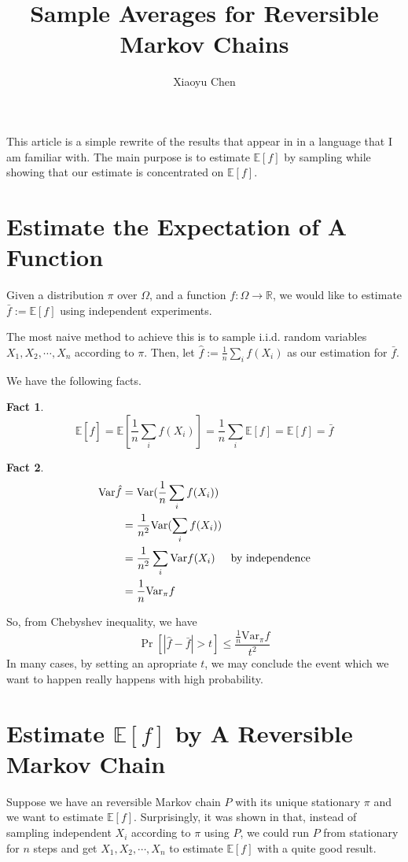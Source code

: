 \documentclass{article}
\title{Sample Averages for Reversible Markov Chains}
\author{Xiaoyu Chen}
\date{}
\newtheorem{fact}{Fact}[section]
\begin{document}
\maketitle
This article is a simple rewrite of the results that appear in \cite{aldous1987markov} in a language that I am familiar with.
The main purpose is to estimate $\mathbb{E}[f]$ by sampling while showing that our estimate is concentrated on $\mathbb{E}[f]$.

\section{Estimate the Expectation of A Function}
Given a distribution $\pi$ over $\Omega$, and a function $f: \Omega \to \mathbb{R}$, we would like to estimate $\bar{f} := \mathbb{E}[f]$ using independent experiments.

The most naive method to achieve this is to sample i.i.d. random variables $X_1, X_2, \cdots, X_n$ according to $\pi$.
Then, let $\hat{f} := \frac{1}{n}\sum_i f(X_i)$ as our estimation for $\bar{f}$.

We have the following facts.

\begin{fact}
  \[\mathbb{E}[\hat{f}] = \mathbb{E}[\frac{1}{n}\sum_i f(X_i)] = \frac{1}{n}\sum_i \mathbb{E}[f] = \mathbb{E}[f] = \bar{f}\]
\end{fact}

\begin{fact}
  \begin{align*}
    \mathrm{Var} \hat{f}
    &= \mathrm{Var} (\frac{1}{n} \sum_i f(X_i)) \\
    &= \frac{1}{n^2} \mathrm{Var} (\sum_i f(X_i)) \\
    &= \frac{1}{n^2} \sum_i \mathrm{Var} f(X_i) \hspace{0.5cm} \mbox{by independence}\\
    &= \frac{1}{n} \mathrm{Var}_\pi f
  \end{align*}
\end{fact}

So, from Chebyshev inequality, we have
\[\Pr[|\hat{f} - \bar{f}| > t] \leq \frac{\frac{1}{n} \mathrm{Var}_\pi f}{t^2}\]
In many cases, by setting an apropriate $t$, we may conclude the event which we want to happen really happens with high probability.

\section{Estimate $\mathbb{E}[f]$ by A Reversible Markov Chain}
 Suppose we have an reversible Markov chain $P$ with its unique stationary $\pi$ and we want to estimate $\mathbb{E}[f]$.
Surprisingly, it was shown in \cite{aldous1987markov} that, instead of sampling independent $X_i$ according to $\pi$ using $P$, we could run $P$ from stationary for $n$ steps and get $X_1, X_2, \cdots, X_n$ to estimate $\mathbb{E}[f]$ with a quite good result.
\end{document}
